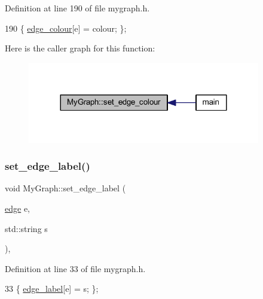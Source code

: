 Definition at line 190 of file mygraph.\+h.


\begin{DoxyCode}
190 \{ \mbox{\hyperlink{class_my_graph_aa10654166ca504696731c7f8011a5680}{edge\_colour}}[e] = colour; \};
\end{DoxyCode}
Here is the caller graph for this function\+:
\nopagebreak
\begin{figure}[H]
\begin{center}
\leavevmode
\includegraphics[width=288pt]{class_my_graph_a865b0e9fd7f74cd40f23230733746a93_icgraph}
\end{center}
\end{figure}
\mbox{\label{class_my_graph_a66d63b8b481c36437061989a868df064}} 
\subsubsection{\texorpdfstring{set\+\_\+edge\+\_\+label()}{set\_edge\_label()}}
{\footnotesize\ttfamily void My\+Graph\+::set\+\_\+edge\+\_\+label (\begin{DoxyParamCaption}\item[{\mbox{\hyperlink{classedge}{edge}}}]{e,  }\item[{std\+::string}]{s }\end{DoxyParamCaption})\hspace{0.3cm}{\ttfamily [inline]}, {\ttfamily [inherited]}}



Definition at line 33 of file mygraph.\+h.


\begin{DoxyCode}
33 \{ \mbox{\hyperlink{class_my_graph_ac87b3f22352ddc7ec3864173a0d69cdd}{edge\_label}}[e] = s; \};
\end{DoxyCode}
\mbox{\label{class_my_graph_a798846d9c09d7d5b49db3c75fb1f7f38}} 

